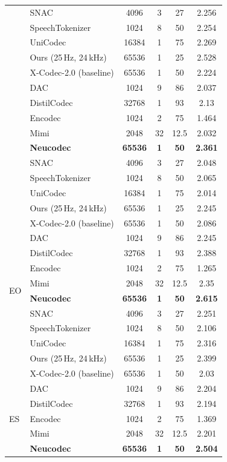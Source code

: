 \documentclass[preprint]{article}
\begin{document}
\begin{longtable}{llcccc}
  & SNAC & 4096 & 3 & 27 & 2.256 \\
  & SpeechTokenizer & 1024 & 8 & 50 & 2.254 \\
  & UniCodec & 16384 & 1 & 75 & 2.269 \\
  & Ours (25\,Hz, 24\,kHz) & 65536 & 1 & 25 & 2.528 \\
  & X-Codec-2.0 (baseline) & 65536 & 1 & 50 & 2.224 \\
\newpage
\multirow{8}{*}{EN}
  & DAC & 1024 & 9 & 86 & 2.037 \\
  & DistilCodec & 32768 & 1 & 93 & 2.13 \\
  & Encodec & 1024 & 2 & 75 & 1.464 \\
  & Mimi & 2048 & 32 & 12.5 & 2.032 \\
  & \textbf{Neucodec} & \textbf{65536} & \textbf{1} & \textbf{50} & \textbf{2.361} \\
  & SNAC & 4096 & 3 & 27 & 2.048 \\
  & SpeechTokenizer & 1024 & 8 & 50 & 2.065 \\
  & UniCodec & 16384 & 1 & 75 & 2.014 \\
  & Ours (25\,Hz, 24\,kHz) & 65536 & 1 & 25 & 2.245 \\
  & X-Codec-2.0 (baseline) & 65536 & 1 & 50 & 2.086 \\
\midrule
\multirow{8}{*}{EO}
  & DAC & 1024 & 9 & 86 & 2.245 \\
  & DistilCodec & 32768 & 1 & 93 & 2.388 \\
  & Encodec & 1024 & 2 & 75 & 1.265 \\
  & Mimi & 2048 & 32 & 12.5 & 2.35 \\
  & \textbf{Neucodec} & \textbf{65536} & \textbf{1} & \textbf{50} & \textbf{2.615} \\
  & SNAC & 4096 & 3 & 27 & 2.251 \\
  & SpeechTokenizer & 1024 & 8 & 50 & 2.106 \\
  & UniCodec & 16384 & 1 & 75 & 2.316 \\
  & Ours (25\,Hz, 24\,kHz) & 65536 & 1 & 25 & 2.399 \\
  & X-Codec-2.0 (baseline) & 65536 & 1 & 50 & 2.03 \\
\midrule
\multirow{8}{*}{ES}
  & DAC & 1024 & 9 & 86 & 2.204 \\
  & DistilCodec & 32768 & 1 & 93 & 2.194 \\
  & Encodec & 1024 & 2 & 75 & 1.369 \\
  & Mimi & 2048 & 32 & 12.5 & 2.201 \\
  & \textbf{Neucodec} & \textbf{65536} & \textbf{1} & \textbf{50} & \textbf{2.504} \\

\end{longtable}
\end{document}
